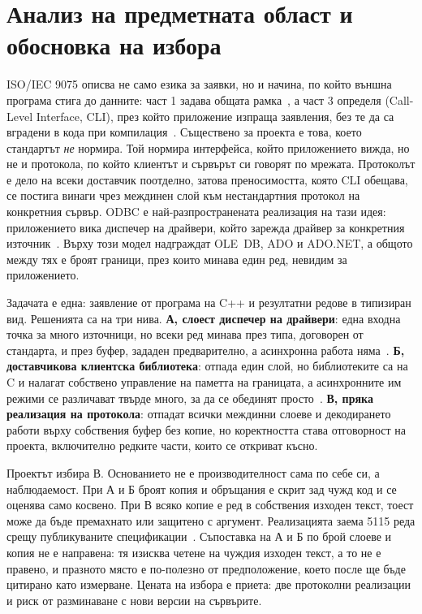 \section{Анализ на предметната област и обосновка на избора}
\label{sec:analysis}

ISO/IEC 9075 описва не само езика за заявки, но и начина, по който външна програма стига до
данните: част 1 задава общата рамка~\cite{sql_framework}, а част 3 определя  (Call-Level Interface, CLI), през който приложение изпраща заявления, без
те да са вградени в кода при компилация~\cite{sql_cli}. Съществено за проекта е това, което
стандартът \emph{не} нормира. Той нормира интерфейса, който
приложението вижда, но не и протокола, по който клиентът и сървърът си говорят по мрежата.
Протоколът е дело на всеки доставчик поотделно, затова преносимостта, която CLI обещава, се
постига винаги чрез междинен слой към нестандартния протокол на конкретния сървър. ODBC е
най-разпространената реализация на тази идея:
приложението вика диспечер на драйвери, който зарежда драйвер за конкретния
източник~\cite{odbc_ref}. Върху този модел надграждат OLE~DB, ADO и ADO.NET, а общото между
тях е броят граници, през които минава един ред, невидим за приложението.

Задачата е една: заявление от програма на C++ и резултатни редове в типизиран вид. Решенията
са на три нива. \textbf{А, слоест диспечер на драйвери}:
една входна точка за много източници, но всеки ред минава през типа, договорен от стандарта,
и през буфер, зададен предварително, а асинхронна работа няма~\cite{odbc_ref}. \textbf{Б,
доставчикова клиентска библиотека}: отпада един слой, но библиотеките са на C и налагат
собствено управление на паметта на границата, а асинхронните им режими се различават
твърде много, за да се обединят просто~\cite{libpq}. \textbf{В, пряка реализация на протокола}:
отпадат всички междинни слоеве и декодирането работи върху собствения буфер без копие, но
коректността става отговорност на проекта, включително редките части, които се откриват късно.

Проектът избира В. Основанието не е производителност сама по себе си, а наблюдаемост. При А и
Б броят копия и обръщания е скрит зад чужд код и се оценява само косвено. При В всяко копие е
ред в собствения изходен текст, тоест може да бъде премахнато или защитено с аргумент.
Реализацията заема 5115 реда срещу публикуваните спецификации~\cite{pg_protocol,
mysql_protocol}. Съпоставка на А и Б по брой слоеве и копия не е направена: тя изисква четене
на чуждия изходен текст, а то не е правено, и празното място е по-полезно от предположение,
което после ще бъде цитирано като измерване. Цената на избора е приета: две протоколни
реализации и риск от разминаване с нови версии на сървърите.
